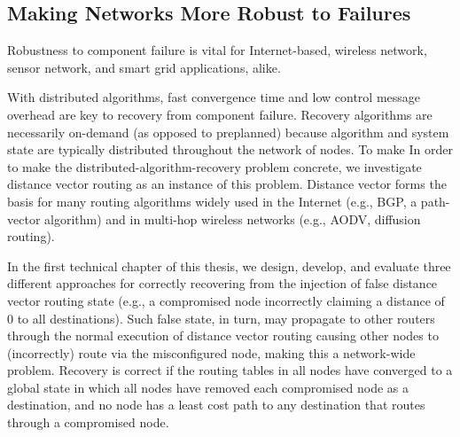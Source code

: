 \subsection{Making Networks More Robust to Failures}



Robustness to component failure is vital for Internet-based, wireless network, sensor network, and smart grid applications, alike. 


With distributed algorithms, fast convergence time and low control message overhead are key to recovery from component failure.  Recovery algorithms are necessarily on-demand (as opposed to preplanned) because 
algorithm and system state are typically distributed throughout the network of nodes.  To make In order to make the distributed-algorithm-recovery problem concrete, we investigate distance vector routing as an instance of this problem.
Distance vector forms the basis for many routing algorithms widely used in the Internet (e.g., BGP, a path-vector algorithm) and in multi-hop wireless networks (e.g., AODV, diffusion routing).

In the first technical chapter of this thesis, we design, develop, and evaluate three different approaches for correctly recovering from the injection of false distance vector routing state (e.g., a compromised node incorrectly
claiming a distance of $0$ to all destinations). Such false state, in turn, may propagate to other routers through the normal execution of distance vector routing causing other nodes to (incorrectly) route via the misconfigured node,
making this a network-wide problem. Recovery is correct if the routing tables in all nodes have converged to a global state in which all nodes have removed each compromised node as a destination,
and no node has a least cost path to any destination that routes through a compromised node.  

